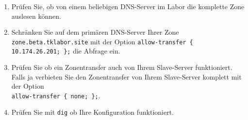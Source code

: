\begin{enumerate}
  \item Prüfen Sie, ob von einem beliebigen DNS-Server im Labor die komplette
  Zone auslesen können.
  \item Schränken Sie auf dem primären DNS-Server Ihrer Zone
  \texttt{zone.beta.tklabor.site} mit der Option \texttt{allow-transfer \{ 10.174.26.201; \};} die Abfrage ein.
  \item Prüfen Sie ob ein Zonentransfer auch von Ihrem Slave-Server
  funktioniert. Falls ja verbieten Sie den Zonentransfer von Ihrem Slave-Server
  komplett mit der Option\\ \texttt{allow-transfer \{ none; \};}.
  \item Prüfen Sie mit \texttt{dig} ob Ihre Konfiguration funktioniert.
\end{enumerate}
